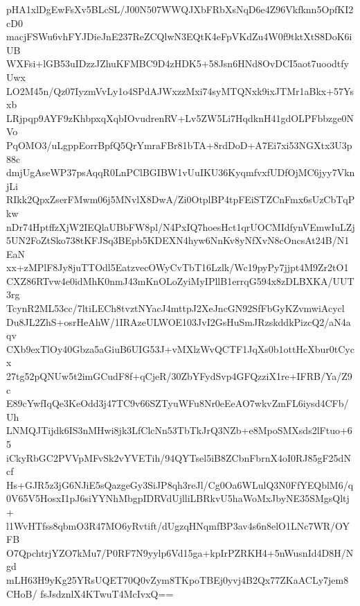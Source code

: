 pHA1xlDgEwFsXv5BLcSL/J00N507WWQJXbFRbXsNqD6e4Z96Vkfknn5OpfKI2cD0
macjFSWu6vhFYJDieJnE237ReZCQlwN3EQtK4eFpVKdZu4W0f9tktXtS8DoK6iUB
WXFsi+lGB53uIDzzJZhuKFMBC9D4zHDK5+58Jsn6HNd8OvDCI5aot7uoodtfyUwx
LO2M45n/Qz07IyzmVvLy1o4SPdAJWxzzMxi74syMTQNxk9ixJTMr1aBkx+57Ysxb
LRjpqp9AYF9zKhbpxqXqbIOvudrenRV+Lv5ZW5Li7HqdknH41gdOLPFbbzge0NVo
PqOMO3/uLgppEorrBpfQ5QrYmraFBr81bTA+8rdDoD+A7Ei7xi53NGXtx3U3p88c
dmjUgAseWP37psAqqR0LnPClBGIBW1vUuIKU36KyqmfvxfUDfOjMC6jyy7VknjLi
RIkk2QpxZserFMwm06j5MNvlX8DwA/Zi0OtplBP4tpFEiSTZCnFmx6sUzCbTqPkw
nDr74HptffzXjW2IEQlaUBbFW8pl/N4PxIQ7hoesHct1qrUOCMIdfynVEmwIuLZj
5UN2FoZtSko738tKFJSq3BEpb5KDEXN4hyw6NnKv8yNfXvN8cOncsAt24B/N1EaN
xx+zMPlF8Jy8juTTOdl5EatzvecOWyCvTbT16Lzlk/Wc19pyPy7jjpt4M9Zr2tO1
CXZ86RTvw4e0idMhK0nmJ43mKnOLoZyiMyIPllB1errqG594x8zDLBXKA/UUT3rg
TcynR2ML53cc/7ltiLECh8tvztNYacJ4mttpJ2XeJncGN92SfFbGyKZvmwiAcycl
Du8JL2ZhS+osrHeAhW/1IRAzeULWOE103JvI2GsHuSmJRzskddkPizcQ2/aN4aqv
CXb9exTlOy40Gbza5aGiuB6UIG53J+vMXlzWvQCTF1JqXs0b1ottHcXbur0tCycx
27tg52pQNUw5t2imGCudF8f+qCjeR/30ZbYFydSvp4GFQzziX1re+IFRB/Ya/Z9c
E89cYwfIqQe3KeOdd3j47TC9v66SZTyuWFu8Nr0eEeAO7wkvZmFL6iysd4CFb/Uh
LNMQJTijdk6IS3nMHwi8jk3LfClcNn53TbTkJrQ3NZb+e8MpoSMXsds2lFtuo+65
iCkyRbGC2PVVpMFvSk2vYVETih/94QYTsel5iB8ZCbnFbrnX4oI0RJ85gF25dNcf
Hs+GJR5z3jG6NJiE5sQazgeGy3SiJP8qh3reJl/Cg0Oa6WLulQ3N0FfYEQblM6/q
0V65V5HosxI1pJ6siYYNhMbgpIDRVdUjlliLBRkvU5haWoMxJbyNE35SMgsQltj+
l1WvHTfss8qbmO3R47MO6yRvtift/dUgzqHNqmfBP3av4s6n8elO1LNc7WR/OYFB
O7QpchtrjYZO7kMu7/P0RF7N9yylp6Vd15ga+kpIrPZRKH4+5nWusnId4D8H/Ngd
mLH63H9yKg25YRsUQET70Q0vZym8TKpoTBEj0yvj4B2Qx77ZKaACLy7jem8CHoB/
fsJsdznlX4KTwuT4McIvxQ==
